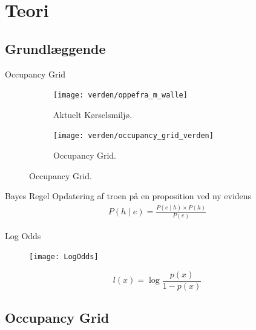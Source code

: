\section{Teori}
\subsection{Grundlæggende}
\begin{frame}{Occupancy Grid}
\begin{figure}[h] %
\centering
	\begin{subfigure}[b]{.48\textwidth}
	\centering
	\texttt{[image: verden/oppefra\_m\_walle]}
	\caption{Aktuelt Kørselsmiljø.}
	\label{map:world}
	\end{subfigure}
	\hfill
	\begin{subfigure}[b]{.48\textwidth}
	\centering
	\texttt{[image: verden/occupancy\_grid\_verden]}
	\caption{Occupancy Grid.}
	\label{map:occupancy_grid}
	\end{subfigure}

\end{figure}
\end{frame}
\begin{frame}{Bayes Regel}
Opdatering af troen på en proposition ved ny evidens
\[
\begin{split}
P(h \mid e) = \frac{P(e \mid h) \times P(h)}{P(e)}
\end{split}
\]
\end{frame}

\begin{frame}{Log Odds}
\begin{figure}
\centering \texttt{[image: LogOdds]}
\label{logoddsimg}
\end{figure}

%

\[
l(x) = \log \frac{p(x)}{1 - p(x)}
\]

\end{frame}

\subsection{Occupancy Grid}

